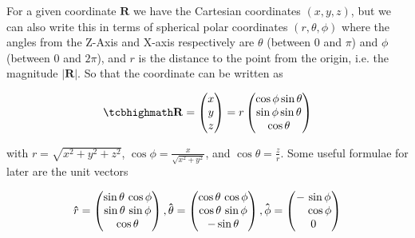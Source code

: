 For a given coordinate $\mathbf{R}$ we have the Cartesian coordinates $(x,y,z)$, but we can also write this in terms of spherical polar coordinates $(r,\theta,\phi)$ where the angles from the Z-Axis and X-axis respectively are $\theta$ (between 0 and $\pi$) and $\phi$ (between 0 and $2\pi$), and $r$ is the distance to the point from the origin, i.e. the magnitude $|\mathbf{R}|$. So that the coordinate can be written as

\begin{equation}
	\mhl{
		\mathbf{R} =
		\begin{pmatrix}
			x \\
			y \\
			z \\
		\end{pmatrix}
		= r
		\begin{pmatrix}
			\cos{\phi}\sin{\theta} \\
			\sin{\phi}\sin{\theta} \\
			\cos{\theta}           \\
		\end{pmatrix}
	}
\end{equation}

with $r=\sqrt{x^2+y^2+z^2}$, $\cos\phi= \frac{x}{\sqrt{x^2+y^2}}$, and $\cos\theta=\frac{z}{r}$. Some useful formulae for later are the unit vectors

\begin{equation}
	\mathbf{\hat{\text{$r$}}} =
	\begin{pmatrix}
		\sin\theta \, \cos\phi \\
		\sin\theta \, \sin\phi \\
		\cos\theta             \\
	\end{pmatrix},
	\mathbf{\hat{\text{$\theta$}}} =
	\begin{pmatrix}
		\cos\theta \, \cos\phi \\
		\cos\theta \, \sin\phi \\
		- \sin\theta           \\
	\end{pmatrix},
	\mathbf{\hat{\text{$\phi$}}} =
	\begin{pmatrix}
		- \, \sin\phi            \\
		\hphantom{-} \, \cos\phi \\
		0                        \\
	\end{pmatrix}
\end{equation}

